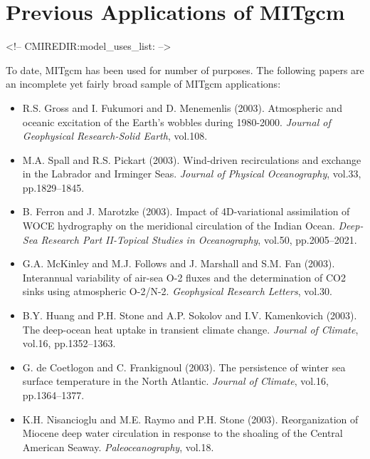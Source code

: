 
\chapter{Previous Applications of MITgcm}
\label{chap:previous_applications}
\begin{rawhtml}
<!-- CMIREDIR:model_uses_list: -->
\end{rawhtml}



To date, MITgcm has been used for number of purposes.  The following
papers are an incomplete yet fairly broad sample of MITgcm
applications:

\begin{itemize}

\item R.S. Gross and I. Fukumori and D. Menemenlis (2003).
Atmospheric and oceanic excitation of the Earth's wobbles during 1980-2000.
{\it Journal of Geophysical Research-Solid Earth}, vol.108.

\item M.A. Spall and R.S. Pickart (2003).
Wind-driven recirculations and exchange in the Labrador and Irminger Seas. 
{\it Journal of Physical Oceanography}, vol.33, pp.1829--1845. 

\item B. Ferron and J. Marotzke (2003).
Impact of 4D-variational assimilation of WOCE hydrography on the
meridional circulation of the Indian Ocean. {\it Deep-Sea Research Part
II-Topical Studies in Oceanography}, vol.50, pp.2005--2021.

\item G.A. McKinley and M.J. Follows and J. Marshall and S.M. Fan (2003).
Interannual variability of air-sea O-2 fluxes and the determination of
CO2 sinks using atmospheric O-2/N-2. {\it Geophysical Research Letters},
vol.30. 

\item B.Y. Huang and P.H. Stone and A.P. Sokolov and I.V. Kamenkovich
(2003). The deep-ocean heat uptake in transient climate change. {\it Journal
of Climate}, vol.16, pp.1352--1363. 

\item G. de Coetlogon and C. Frankignoul (2003). The persistence of winter
sea surface temperature in the North Atlantic. {\it Journal of Climate},
vol.16, pp.1364--1377. 

\item K.H. Nisancioglu and M.E. Raymo and P.H. Stone (2003).
Reorganization of Miocene deep water circulation in response to the
shoaling of the Central American Seaway. {\it Paleoceanography}, vol.18. 


\end{itemize}
